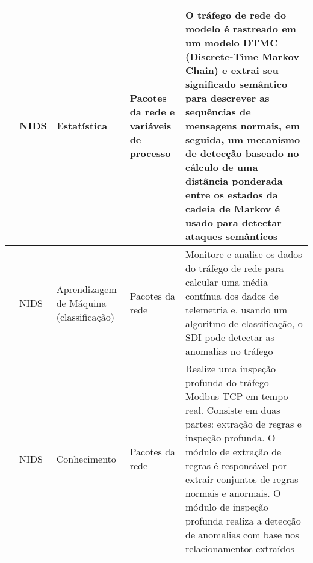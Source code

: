 \begin{anexosenv}
\begin{longtable}{|P{2.25cm}|p{1.00cm}|p{2.50cm}|p{1.75cm}|p{6.25cm}|}
            \hline
            \cite{caseli2015} & NIDS & Estatística & Pacotes da rede e variáveis de processo & O tráfego de rede do modelo é rastreado em um modelo DTMC (Discrete-Time Markov Chain) e extrai seu significado semântico para descrever as sequências de mensagens normais, em seguida, um mecanismo de detecção baseado no cálculo de uma distância ponderada entre os estados da cadeia de Markov é usado para detectar ataques semânticos \\
            \hline
            \cite{ponomarec2016} & NIDS & Aprendizagem de Máquina (classificação) & Pacotes da rede & Monitore e analise os dados do tráfego de rede para calcular uma média contínua dos dados de telemetria e, usando um algoritmo de classificação, o SDI pode detectar as anomalias no tráfego \\
            \hline
            \cite{yusheng2017} & NIDS & Conhecimento & Pacotes da rede & Realize uma inspeção profunda do tráfego Modbus TCP em tempo real. Consiste em duas partes: extração de regras e inspeção profunda. O módulo de extração de regras é responsável por extrair conjuntos de regras normais e anormais. O módulo de inspeção profunda realiza a detecção de anomalias com base nos relacionamentos extraídos \\
            \hline
        \end{longtable}
        \renewcommand\LTcaptype{table}

\end{anexosenv}

